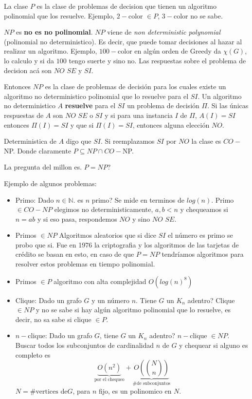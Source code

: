\documentclass[12pt,a4paper]{article}
\begin{document}
La clase $P$ es la clase de problemas de decision que tienen un algoritmo polinomial 
que los resuelve. Ejemplo, $2-$color $\in P$, $3-$color no se sabe.
\medskip

$NP$ es \textbf{no es no polinomial}. $NP$ viene de \textit{non deterministic polynomial} 
(polinomial no deterministico). Es decir, que puede tomar decisiones al hazar al 
realizar un algoritmo. Ejemplo, $100-$color en algún orden de Greedy da $\chi (G)$, 
lo calculo y si da $100$ tengo suerte y sino no. Las respuestas sobre el problema 
de decision acá son $NO\,\, SE$ y $SI$.
\medskip

Entonces $NP$ es la clase de problemas de decisión para los cuales existe un algoritmo 
no deterministico polinomial que lo resuelve para el $SI$. Un algoritmo no deterministico 
$A$ \textbf{resuelve} para el $SI$ un problema de decisión $\Pi$. Si las únicas 
respuestas de $A$ son $NO\,\,SE$ o $SI$ y si para una instancia $I$ de $\Pi$,
$A(I) = SI$ entonces $\Pi(I) = SI$ y que si $\Pi(I) = SI$, entonces alguna 
elección $NO$.
\medskip

Deterministica de $A$ digo que $SI$. Si reemplazamos $SI$ por $NO$ la clase es 
$CO-$NP. Donde claramente $P \subseteq NP \cap CO-$NP.
\medskip

La pregunta del millon es. $P = NP$? 
\medskip

Ejemplo de algunos problemas:
\begin{itemize}
    \item Primo: Dado $n\in \mathbb{N}$. es $n$ primo? Se mide en terminos de 
        $log(n)$. Primo $\in CO-NP$ elegimos no deterministicamente, $a,b < n$ y 
        chequeamos si $n=ab$ y si eso pasa, respondemos $NO$ y sino $NO\,\,SE$.
    \item Primos $\in NP$ Algoritmos aleatorios que si dice $SI$ el número es primo
        se probo que si. Fue en 1976 la criptografia y los algoritmos de las tarjetas 
        de crédito se basan en esto, en caso de que $P = NP$ tendríamos algoritmos 
        para resolver estos problemas en tiempo polinomial.
    \item Primos $\in P$ algoritmo con alta complejidad $O(log(n)^{8})$
    \item Clique: Dado un grafo $G$ y un número $n$. Tiene $G$ un $K_{n}$ adentro?
        Clique $\in NP$ y no se sabe si hay algún algoritmo polinomial que lo 
        resuelve, es decir, no sa sabe si clique $\in P$.
    \item $n-$clique: Dado un grafo $G$, tiene $G$ un $K_{n}$ adentro? $n-$clique 
        $\in NP$. Buscar todos los subconjuntos de cardinalidad $n$ de $G$ y chequear
        si alguno es completo es
        $$\underbrace{O(n^{2})}_{\text{por el chequeo}} + \underbrace{O(\binom{N}{n})}_{\text{\# de subconjuntos}}$$
        $N = \# \text{vertices de} G$, para $n$ fijo, es un polinomico en $N$.
\end{itemize}
\end{document}
